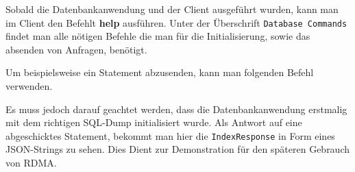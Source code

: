 \begin{center}
\end{center}

Sobald die Datenbankanwendung und der Client ausgeführt wurden, kann man im Client den Befehlt \textbf{help} ausführen. Unter der Überschrift \texttt{Database Commands} findet man alle nötigen Befehle die man für die Initialisierung, sowie das absenden von Anfragen, benötigt.

Um beispielsweise ein Statement abzusenden, kann man folgenden Befehl verwenden. 

\begin{center}
\end{center}

Es muss jedoch darauf geachtet werden, dass die Datenbankanwendung erstmalig mit dem richtigen SQL-Dump initialisiert wurde. Als Antwort auf eine abgeschicktes Statement, bekommt man hier die \texttt{IndexResponse} in Form eines JSON-Strings zu sehen. Dies Dient zur Demonstration für den späteren Gebrauch von RDMA.




